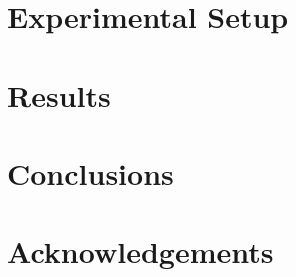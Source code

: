 \documentclass[twocolumn]{tum-article}
\begin{document}
\lipsum[3-4]

\section{Experimental Setup}

\lipsum[4-5]

\section{Results}

\lipsum[6]

\section{Conclusions}

\lipsum[7]

\section*{Acknowledgements}

\lipsum[8]



\end{document}
